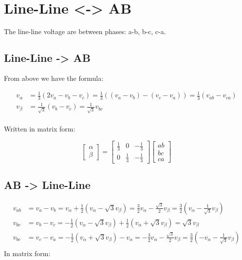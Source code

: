 \documentclass[]{book}
\begin{document}
\hypertarget{line-line---ab}{%
\section{Line-Line \textless{}-\textgreater{} AB}\label{line-line---ab}}

The line-line voltage are between phases: a-b, b-c, c-a.

\hypertarget{line-line---ab-1}{%
\subsection{Line-Line -\textgreater{} AB}\label{line-line---ab-1}}

From above we have the formula:

\[
\begin{aligned}
v_\alpha &=  \frac{1}{3} ( 2 v_a - v_b-v_c) = \frac{1}{3} ( (v_a - v_b)-(v_c-v_a))= \frac{1}{3} ( v_{ab} - v_{ca})   \\
v_\beta &=   \frac{1}{\sqrt{3}} (v_b-v_c) = \frac{1}{\sqrt{3}} v_{bc}   \\
\end{aligned}
\label{eq:abcAB1}
\]

Written in matrix form:

\[
\begin{bmatrix} \alpha\\ \beta \end{bmatrix}
= \begin{bmatrix} \frac{1}{3} & 0 & -\frac{1}{3} \\ 0 & \frac{1}{3} & -\frac{1}{3} \end{bmatrix}
\begin{bmatrix} ab\\ bc \\ ca \end{bmatrix}
\label{eq:abcABmat2}
\]

\hypertarget{ab---line-line}{%
\subsection{AB -\textgreater{} Line-Line}\label{ab---line-line}}

\[
\begin{aligned}
v_{ab} &=  v_a - v_b =v_\alpha + \frac{1}{2}(v_\alpha -\sqrt{3}v_\beta)
=\frac{3}{2}v_\alpha - \frac{\sqrt{3}}{2}v_\beta 
=\frac{3}{2} (v_\alpha - \frac{1}{\sqrt{3}}v_\beta  )  \\
v_{bc} &=  v_b - v_c =  - \frac{1}{2}(v_\alpha -\sqrt{3}v_\beta)+ \frac{1}{2}(v_\alpha +\sqrt{3}v_\beta) = \sqrt{3}v_\beta  \\
v_{bc} &=  v_c - v_a =  - \frac{1}{2}(v_\alpha +\sqrt{3}v_\beta) - v_\alpha 
= -\frac{3}{2}v_\alpha - \frac{\sqrt{3}}{2}v_\beta =\frac{3}{2} (-v_\alpha - \frac{1}{\sqrt{3}}v_\beta  )  \\
\end{aligned}
\label{eq:abcAB1}
\]
In matrix form:
\end{document}
